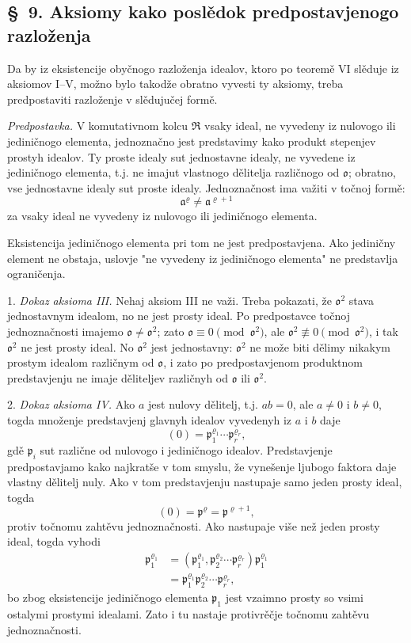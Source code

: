 \documentclass[11pt]{article}
\providecommand{\mR}{\mathfrak{R}}
\providecommand{\ma}{\mathfrak{a}}
\providecommand{\mo}{\mathfrak{o}}
\providecommand{\mpideal}{\mathfrak{p}}
\begin{document}
\setcounter{footnote}{31}

\subsection*{\S~9. Aksiomy kako poslědok predpostavjenogo razloženja}

Da by iz eksistencije obyčnogo razloženja idealov, ktoro po teoremě VI slěduje iz aksiomov I--V, možno bylo takodže obratno vyvesti ty aksiomy, treba predpostaviti razloženje v slědujučej formě.

\emph{Predpostavka.} V komutativnom kolcu $\mR$ vsaky ideal, ne vyvedeny iz nulovogo ili jediničnogo elementa, jednoznačno jest predstavimy kako produkt stepenjev prostyh idealov. Ty proste idealy sut jednostavne idealy, ne vyvedene iz jediničnogo elementa, t.j. ne imajut vlastnogo dělitelja različnogo od $\mo$; obratno, vse jednostavne idealy sut proste idealy. Jednoznačnost ima važiti v točnoj formě:
\[
        \ma^\varrho\ne\ma^{\varrho+1}
\]
za vsaky ideal ne vyvedeny iz nulovogo ili jediničnogo elementa.

Eksistencija jediničnogo elementa pri tom ne jest predpostavjena. Ako jediničny element ne obstaja, uslovje "ne vyvedeny iz jediničnogo elementa" ne predstavlja ograničenja.

1. \emph{Dokaz aksioma III.} Nehaj aksiom III ne važi. Treba pokazati, že $\mo^2$ stava jednostavnym idealom, no ne jest prosty ideal. Po predpostavce točnoj jednoznačnosti imajemo $\mo\ne\mo^2$; zato $\mo\equiv0\pmod{\mo^2}$, ale $\mo^2\not\equiv0\pmod{\mo^2}$, i tak $\mo^2$ ne jest prosty ideal. No $\mo^2$ jest jednostavny: $\mo^2$ ne može biti dělimy nikakym prostym idealom različnym od $\mo$, i zato po predpostavjenom produktnom predstavjenju ne imaje děliteljev različnyh od $\mo$ ili $\mo^2$.

2. \emph{Dokaz aksioma IV.} Ako $a$ jest nulovy dělitelj, t.j. $ab=0$, ale $a\ne0$ i $b\ne0$, togda množenje predstavjenj glavnyh idealov vyvedenyh iz $a$ i $b$ daje
\[
        (0)=\mpideal_1^{\varrho_1}\cdots\mpideal_r^{\varrho_r},
\]
gdě $\mpideal_i$ sut različne od nulovogo i jediničnogo idealov. Predstavjenje predpostavjamo kako najkratše v tom smyslu, že vynešenje ljubogo faktora daje vlastny dělitelj nuly. Ako v tom predstavjenju nastupaje samo jeden prosty ideal, togda
\[
        (0)=\mpideal^\varrho=\mpideal^{\varrho+1},
\]
protiv točnomu zahtěvu jednoznačnosti. Ako nastupaje više než jeden prosty ideal, togda vyhodi
\[
\begin{aligned}
\mpideal_1^{\varrho_1}
 &= (\mpideal_1^{\varrho_1},\mpideal_2^{\varrho_2}\cdots\mpideal_r^{\varrho_r})\mpideal_1^{\varrho_1}  \\
 &= \mpideal_1^{\varrho_1}\mpideal_2^{\varrho_2}\cdots\mpideal_r^{\varrho_r},
\end{aligned}
\]
bo zbog eksistencije jediničnogo elementa $\mpideal_1$ jest vzaimno prosty so vsimi ostalymi prostymi idealami. Zato i tu nastaje protivrěčje točnomu zahtěvu jednoznačnosti.
\end{document}
